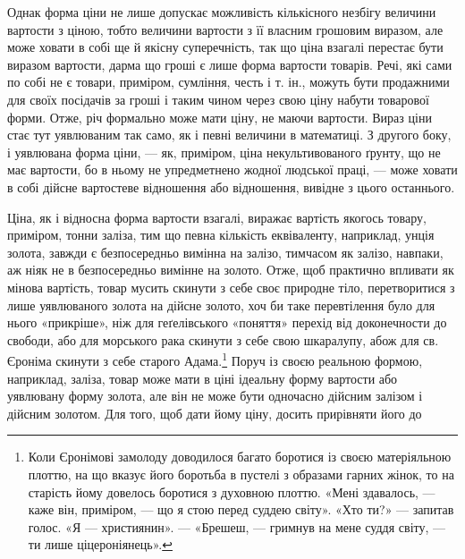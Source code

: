 Однак форма ціни не лише допускає можливість кількісного
незбігу величини вартости з ціною, тобто величини вартости
з її власним грошовим виразом, але може ховати в собі ще й
якісну суперечність, так що ціна взагалі перестає бути виразом
вартости, дарма що гроші є лише форма вартости товарів. Речі,
які сами по собі не є товари, приміром, сумління, честь і т. ін.,
можуть бути продажними для своїх посідачів за гроші і таким
чином через свою ціну набути товарової форми. Отже, річ формально
може мати ціну, не маючи вартости. Вираз ціни стає тут
уявлюваним так само, як і певні величини в математиці. З другого
боку, і уявлювана форма ціни, — як, приміром, ціна некультивованого
ґрунту, що не має вартости, бо в ньому не упредметнено
жодної людської праці, — може ховати в собі дійсне вартостеве
відношення або відношення, вивідне з цього останнього.

Ціна, як і відносна форма вартости взагалі, виражає вартість
якогось товару, приміром, тонни заліза, тим що певна кількість
еквіваленту, наприклад, унція золота, завжди є безпосередньо
вимінна на залізо, тимчасом як залізо, навпаки, аж ніяк не в
безпосередньо вимінне на золото. Отже, щоб практично впливати
як мінова вартість, товар мусить скинути з себе своє природне
тіло, перетворитися з лише уявлюваного золота на дійсне
золото, хоч би таке перевтілення було для нього «прикріше»,
ніж для геґелівського «поняття» перехід від доконечности до
свободи, або для морського рака скинути з себе свою шкаралупу,
абож для св. Єроніма скинути з себе старого Адама.\footnote{
Коли Єронімові замолоду доводилося багато боротися із своєю
матеріяльною плоттю, на що вказує його боротьба в пустелі з образами
гарних жінок, то на старість йому довелось боротися з духовною плоттю.
«Мені здавалось, — каже він, приміром, — що я стою перед суддею світу».
«Хто ти?» — запитав голос. «Я — християнин». — «Брешеш, — гримнув
на мене суддя світу, — ти лише ціцероніянець».
} Поруч
із своєю реальною формою, наприклад, заліза, товар може мати
в ціні ідеальну форму вартости або уявлювану форму золота,
але він не може бути одночасно дійсним залізом і дійсним золотом.
Для того, щоб дати йому ціну, досить прирівняти його до
\parbreak{}  %
